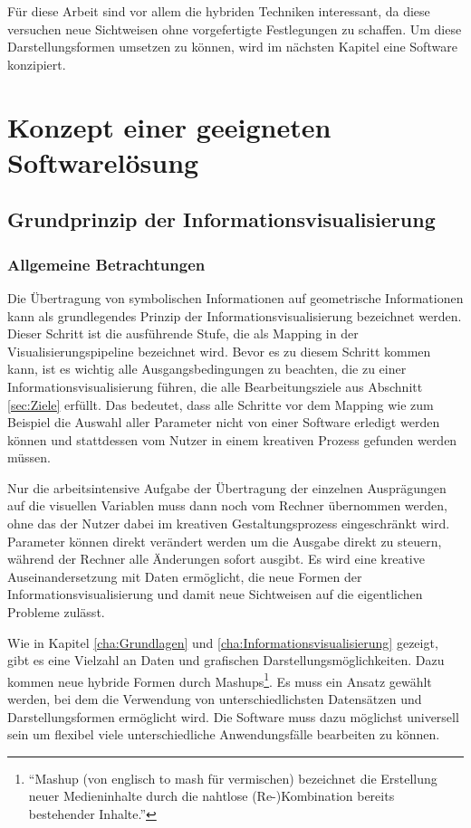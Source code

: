 \documentclass[a4paper, 12pt, DIVcalc, onepage, pdftex, headsepline, footsepline]{scrreprt}
\begin{document}
Für diese Arbeit sind vor allem die hybriden Techniken interessant, da diese versuchen
neue Sichtweisen ohne vorgefertigte Festlegungen zu schaffen. Um diese Darstellungsformen
umsetzen zu können, wird im nächsten Kapitel eine Software konzipiert.

\chapter{Konzept einer geeigneten Softwarelösung}
\label{cha:Software}
\section{Grundprinzip der Informationsvisualisierung}
\label{sec:Grundprinzip}
\subsection{Allgemeine Betrachtungen}
Die Übertragung von symbolischen Informationen auf geometrische Informationen kann als grundlegendes Prinzip der
Informationsvisualisierung bezeichnet werden. Dieser Schritt ist die ausführende Stufe, die als Mapping in der
Visualisierungspipeline bezeichnet wird. Bevor es zu diesem Schritt kommen kann, ist es wichtig
alle Ausgangsbedingungen zu beachten, die zu einer Informationsvisualisierung führen, die alle Bearbeitungsziele aus
Abschnitt \ref{sec:Ziele} erfüllt. Das bedeutet, dass alle Schritte vor dem Mapping wie zum Beispiel die Auswahl
aller Parameter nicht von einer Software erledigt werden können und stattdessen vom Nutzer in einem kreativen
Prozess gefunden werden müssen.

Nur die arbeitsintensive Aufgabe der Übertragung der einzelnen Ausprägungen auf die visuellen Variablen muss
dann noch vom Rechner übernommen werden, ohne das der Nutzer dabei im kreativen Gestaltungsprozess eingeschränkt
wird. Parameter können direkt verändert werden um die Ausgabe direkt zu steuern, während der
Rechner alle Änderungen sofort ausgibt. Es wird eine kreative Auseinandersetzung
mit Daten ermöglicht, die neue Formen der Informationsvisualisierung und damit neue Sichtweisen auf
die eigentlichen Probleme zulässt.

Wie in Kapitel \ref{cha:Grundlagen} und \ref{cha:Informationsvisualisierung} gezeigt, gibt es eine Vielzahl an
Daten und grafischen Darstellungsmöglichkeiten. Dazu kommen neue hybride Formen durch Mashups\footnote{"`Mashup (von
englisch to mash für vermischen) bezeichnet die Erstellung neuer Medieninhalte durch die nahtlose
(Re-)Kombination bereits bestehender Inhalte."'\citep{wiki_mashup}}. Es muss ein Ansatz gewählt
werden, bei dem die Verwendung von unterschiedlichsten Datensätzen und Darstellungsformen ermöglicht wird.
Die Software muss dazu möglichst universell sein um flexibel viele unterschiedliche Anwendungsfälle
bearbeiten zu können.
\end{document}
